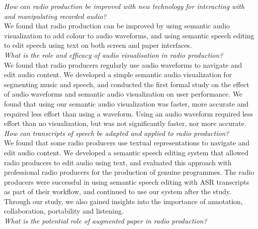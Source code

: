 \noindent
\hangindent=15pt
\textit{How can radio production be improved with new technology for interacting with and manipulating recorded audio?}
\\

  We found that radio production can be improved by using semantic audio visualization to add colour to audio
  waveforms, and using semantic speech editing to edit speech using text on both screen and paper interfaces.
  \\

\noindent
\hangindent=15pt
\textit{What is the role and efficacy of audio visualisation in radio production?}
\\

We found that radio producers regularly use audio waveforms to navigate and edit audio content.  We developed a
simple semantic audio visualization for segmenting music and speech, and conducted the first formal study on the effect
of audio waveforms and semantic audio visualization on user performance. We found that using our semantic audio
visualization was faster, more accurate and required less effort than using a waveform.  Using an audio waveform
required less effort than no visualization, but was not significantly faster, nor more accurate.
\\

\noindent
\hangindent=15pt
\textit{How can transcripts of speech be adapted and applied to radio production?}
\\

We found that some radio producers use textual representations to navigate and edit audio content.  We developed a
semantic speech editing system that allowed radio producers to edit audio using text, and evaluated this approach with
professional radio producers for the production of genuine programmes. The radio producers were successful in using
semantic speech editing with ASR transcripts as part of their workflow, and continued to use our system after the
study. Through our study, we also gained insights into the importance of annotation, collaboration, portability and
listening.
\\

\noindent
\hangindent=15pt
\textit{What is the potential role of augmented paper in radio production?}
\\

